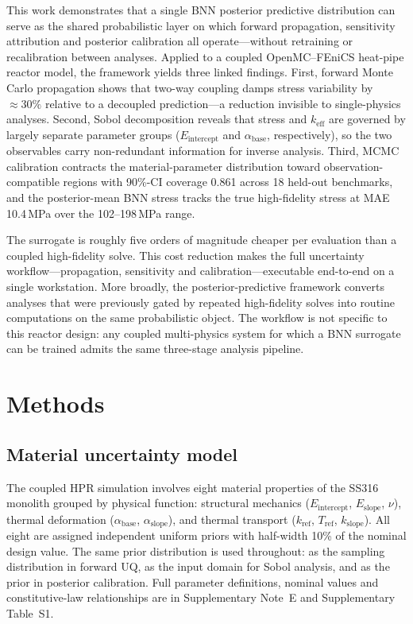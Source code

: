 \documentclass[11pt,a4paper]{article}
\newcommand{\keff}{\ensuremath{k_{\mathrm{eff}}}}
\newcommand{\Eint}{\ensuremath{E_{\mathrm{intercept}}}}
\newcommand{\Eslope}{\ensuremath{E_{\mathrm{slope}}}}
\newcommand{\abase}{\ensuremath{\alpha_{\mathrm{base}}}}
\newcommand{\aslope}{\ensuremath{\alpha_{\mathrm{slope}}}}
\newcommand{\kref}{\ensuremath{k_{\mathrm{ref}}}}
\newcommand{\Tref}{\ensuremath{T_{\mathrm{ref}}}}
\newcommand{\kslope}{\ensuremath{k_{\mathrm{slope}}}}
\begin{document}
This work demonstrates that a single BNN posterior predictive
distribution can serve as the shared probabilistic layer on which
forward propagation, sensitivity attribution and posterior calibration
all operate---without retraining or recalibration between analyses.
Applied to a coupled OpenMC--FEniCS heat-pipe reactor model, the
framework yields three linked findings. First, forward Monte Carlo
propagation shows that two-way coupling damps stress variability by
${\approx}30\%$ relative to a decoupled prediction---a reduction
invisible to single-physics analyses. Second, Sobol decomposition
reveals that stress and \keff{} are governed by largely separate
parameter groups (\Eint{} and \abase{}, respectively), so the two
observables carry non-redundant information for inverse analysis. Third,
MCMC calibration contracts the material-parameter distribution toward
observation-compatible regions with 90\%-CI coverage 0.861 across 18
held-out benchmarks, and the posterior-mean BNN stress tracks the true
high-fidelity stress at MAE 10.4\,MPa over the 102--198\,MPa range.

The surrogate is roughly five orders of magnitude cheaper per evaluation
than a coupled high-fidelity solve. This cost reduction makes the full
uncertainty workflow---propagation, sensitivity and calibration---executable
end-to-end on a single workstation. More broadly, the posterior-predictive
framework converts analyses that were previously gated by repeated
high-fidelity solves into routine computations on the same probabilistic
object. The workflow is not specific to this reactor design: any coupled
multi-physics system for which a BNN surrogate can be trained admits the
same three-stage analysis pipeline.

\section{Methods}

\subsection{Material uncertainty model}

The coupled HPR simulation involves eight material properties of the
SS316 monolith grouped by physical function: structural mechanics
(\Eint{}, \Eslope{}, $\nu$), thermal deformation (\abase{}, \aslope{}),
and thermal transport (\kref{}, \Tref{}, \kslope{}). All eight are
assigned independent uniform priors with half-width 10\% of the nominal
design value. The same prior distribution is used throughout: as the
sampling distribution in forward UQ, as the input domain for Sobol
analysis, and as the prior in posterior calibration. Full parameter
definitions, nominal values and constitutive-law relationships are in
Supplementary Note~E and Supplementary Table~S1.
\end{document}
